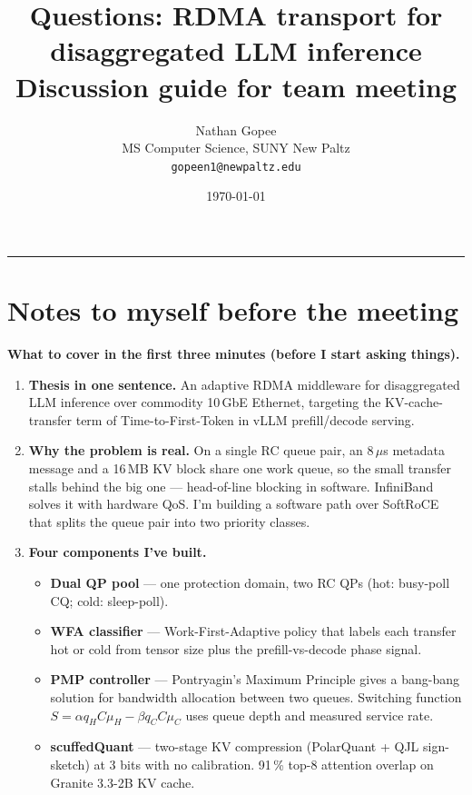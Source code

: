 \documentclass[11pt]{article}
\title{Questions: RDMA transport for disaggregated LLM inference\\[4pt]
       \large Discussion guide for team meeting}
\author{Nathan Gopee\\MS Computer Science, SUNY New Paltz\\\texttt{gopeen1@newpaltz.edu}}
\date{\today}
\begin{document}
\maketitle
\thispagestyle{fancy}

\hrule
\vspace{6pt}

\section*{Notes to myself before the meeting}

\textbf{What to cover in the first three minutes (before I start asking
things).}

\begin{enumerate}
\item \textbf{Thesis in one sentence.} An adaptive RDMA middleware for
disaggregated LLM inference over commodity 10\,GbE Ethernet, targeting
the KV-cache-transfer term of Time-to-First-Token in vLLM
prefill/decode serving.

\item \textbf{Why the problem is real.} On a single RC queue pair, an
8\,$\mu$s metadata message and a 16\,MB KV block share one work queue,
so the small transfer stalls behind the big one --- head-of-line
blocking in software. InfiniBand solves it with hardware QoS. I'm
building a software path over SoftRoCE that splits the queue pair into
two priority classes.

\item \textbf{Four components I've built.}
  \begin{itemize}
  \item \textbf{Dual QP pool} --- one protection domain, two RC QPs
  (hot: busy-poll CQ; cold: sleep-poll).
  \item \textbf{WFA classifier} --- Work-First-Adaptive policy that
  labels each transfer hot or cold from tensor size plus the
  prefill-vs-decode phase signal.
  \item \textbf{PMP controller} --- Pontryagin's Maximum Principle
  gives a bang-bang solution for bandwidth allocation between two
  queues. Switching function
  $S = \alpha q_H C \mu_H - \beta q_C C \mu_C$ uses queue depth and
  measured service rate.
  \item \textbf{scuffedQuant} --- two-stage KV compression
  (PolarQuant + QJL sign-sketch) at 3 bits with no calibration.
  91\,\% top-8 attention overlap on Granite 3.3-2B KV cache.
  \end{itemize}


\end{enumerate}
\end{document}
